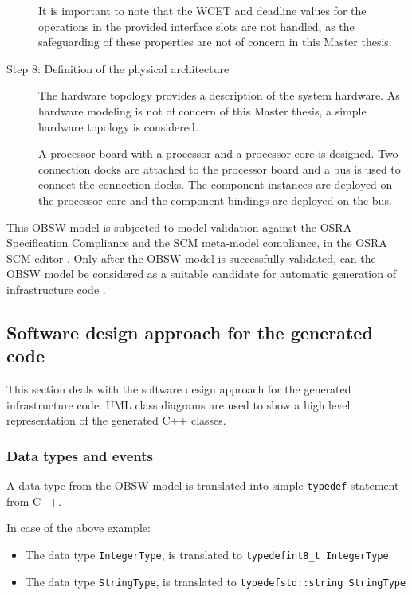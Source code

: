 \begin{description}
It is important to note that the WCET and deadline values for the operations in the provided interface slots are not handled, as the safeguarding of these properties are not of concern in this Master thesis. 

\item [Step 8: Definition of the physical architecture] The hardware topology provides a description of the system hardware. As hardware modeling is not of concern of this Master thesis, a simple hardware topology is considered. 

A processor board with a processor and a processor core is designed. Two connection docks are attached to the processor board and a bus is used to connect the connection docks. The component instances are deployed on the processor core and the component bindings are deployed on the bus. 
\end{description}

This OBSW model is subjected to model validation against the OSRA Specification Compliance and the SCM meta-model compliance, in the OSRA SCM editor \cite{OSRAEditor}. Only after the OBSW model is successfully validated, can the OBSW model be considered as a suitable candidate for automatic generation of infrastructure code \cite{OSRAEditor}.  
   
\subsection{Software design approach for the generated code}
This section deals with the software design approach for the generated infrastructure code. UML class diagrams are used to show a high level representation of the generated C++ classes.  

\subsubsection{\textbf{Data types and events}}
A data type from the OBSW model is translated into simple \texttt{typedef} statement from C++.

In case of the above example:
\begin{itemize}
\item The data type \texttt{IntegerType}, is translated to \texttt{typedef\allowbreak  int8\_t IntegerType}
\item The data type \texttt{StringType}, is translated to \texttt{typedef\allowbreak std::string StringType} 
\end{itemize}

